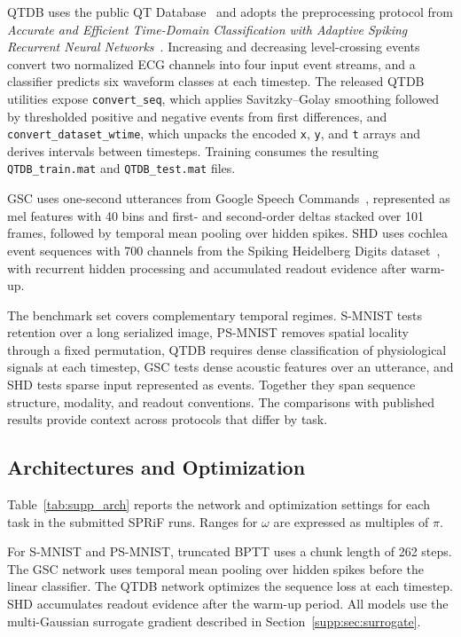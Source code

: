 \documentclass[letterpaper]{article}
\begin{document}
QTDB uses the public QT Database~\cite{laguna1997database} and adopts the preprocessing protocol from \emph{Accurate and Efficient Time-Domain Classification with Adaptive Spiking Recurrent Neural Networks}~\cite{asrnn}. Increasing and decreasing level-crossing events convert two normalized ECG channels into four input event streams, and a classifier predicts six waveform classes at each timestep. The released QTDB utilities expose \texttt{convert\_seq}, which applies Savitzky--Golay smoothing followed by thresholded positive and negative events from first differences, and \texttt{convert\_dataset\_wtime}, which unpacks the encoded \texttt{x}, \texttt{y}, and \texttt{t} arrays and derives intervals between timesteps. Training consumes the resulting \texttt{QTDB\_train.mat} and \texttt{QTDB\_test.mat} files.

GSC uses one-second utterances from Google Speech Commands~\cite{warden2018speech}, represented as mel features with 40 bins and first- and second-order deltas stacked over 101 frames, followed by temporal mean pooling over hidden spikes. SHD uses cochlea event sequences with 700 channels from the Spiking Heidelberg Digits dataset~\cite{cramer2022heidelberg}, with recurrent hidden processing and accumulated readout evidence after warm-up.

The benchmark set covers complementary temporal regimes. S-MNIST tests retention over a long serialized image, PS-MNIST removes spatial locality through a fixed permutation, QTDB requires dense classification of physiological signals at each timestep, GSC tests dense acoustic features over an utterance, and SHD tests sparse input represented as events. Together they span sequence structure, modality, and readout conventions. The comparisons with published results provide context across protocols that differ by task.

\subsection{Architectures and Optimization}
\label{supp:sec:architectures}

Table~\ref{tab:supp_arch} reports the network and optimization settings for each task in the submitted SPRiF runs. Ranges for $\omega$ are expressed as multiples of $\pi$.

For S-MNIST and PS-MNIST, truncated BPTT uses a chunk length of 262 steps. The GSC network uses temporal mean pooling over hidden spikes before the linear classifier. The QTDB network optimizes the sequence loss at each timestep. SHD accumulates readout evidence after the warm-up period. All models use the multi-Gaussian surrogate gradient described in Section~\ref{supp:sec:surrogate}.
\end{document}

